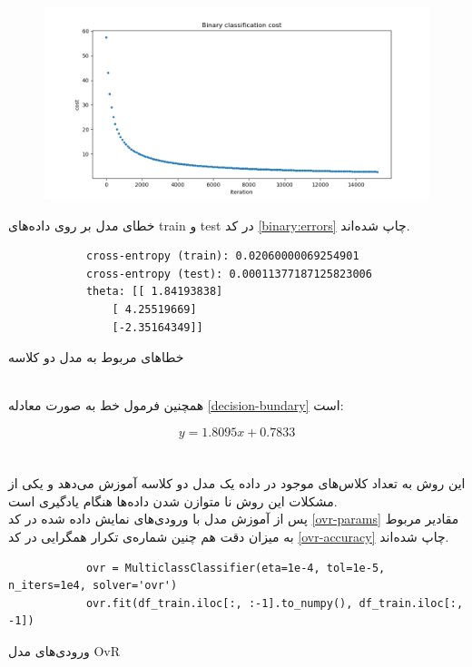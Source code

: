 \documentclass[]{article}
\begin{document}
\begin{figure}[h]
	\centering
	\includegraphics[width=1\linewidth]{bi-logistic-costs}
	\caption{}
	\label{fig:bi-logistic-costs}
\end{figure}
\newpage
خطای مدل بر روی داده‌های train و test در کد \ref{binary:errors} چاپ شده‌اند.

\begin{code}[h]
	\begin{latin}
		\begin{verbatim}
			cross-entropy (train): 0.02060000069254901
			cross-entropy (test): 0.00011377187125823006
			theta: [[ 1.84193838]
				[ 4.25519669]
				[-2.35164349]]
		\end{verbatim}
	\end{latin}
	\caption{خطا‌های مربوط به مدل دو کلاسه}
	\label{binary:errors}
\end{code}
\\
همچنین فرمول خط  به صورت معادله \ref{decision-bundary} است:

\begin{equation}
	y = 1.8095 x + 0.7833
	\label{decision-bundary}
\end{equation}

\section{\textbf{}}

\subsection{}
این روش به تعداد کلاس‌های موجود در داده یک مدل دو کلاسه آموزش می‌دهد و یکی از مشکلات این روش نا متوازن شدن داده‌ها هنگام یادگیری است.\\
پس از آموزش مدل با ورودی‌های نمایش داده شده در کد \ref{ovr-params} مقادیر مربوط به میزان دقت هم چنین شماره‌ی تکرار همگرایی در کد \ref{ovr-accuracy} چاپ شده‌اند.
\begin{code}[h]
	\begin{latin}
		\begin{verbatim}
			ovr = MulticlassClassifier(eta=1e-4, tol=1e-5, n_iters=1e4, solver='ovr')
			ovr.fit(df_train.iloc[:, :-1].to_numpy(), df_train.iloc[:, -1])
		\end{verbatim}
	\end{latin}
	\caption{ورودی‌های مدل OvR}
	\label{ovr-params}
\end{code}
\end{document}
